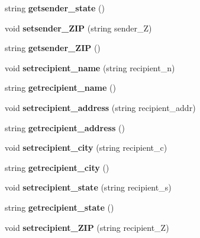 \begin{DoxyCompactItemize}
string {\bfseries getsender\+\_\+state} ()
\item 
\mbox{\label{class_package_a56cf09ba2ac0d10ccf1661d9394c6b85}} 
void {\bfseries setsender\+\_\+\+Z\+IP} (string sender\+\_\+Z)
\item 
\mbox{\label{class_package_a66539199f86eed481721ff0851676109}} 
string {\bfseries getsender\+\_\+\+Z\+IP} ()
\item 
\mbox{\label{class_package_a7f22cd63211c0c766ddf32926362c885}} 
void {\bfseries setrecipient\+\_\+name} (string recipient\+\_\+n)
\item 
\mbox{\label{class_package_a8022d4210f41bc9e0dae744aae7c5bbc}} 
string {\bfseries getrecipient\+\_\+name} ()
\item 
\mbox{\label{class_package_a5ec7ebc5d7640f5f8c8e1747689b5e8a}} 
void {\bfseries setrecipient\+\_\+address} (string recipient\+\_\+addr)
\item 
\mbox{\label{class_package_a68e6c329e3ee89e578befa648b3e47e8}} 
string {\bfseries getrecipient\+\_\+address} ()
\item 
\mbox{\label{class_package_a6a9facae5d8ccf6a6cd5128a8b3583e2}} 
void {\bfseries setrecipient\+\_\+city} (string recipient\+\_\+c)
\item 
\mbox{\label{class_package_aa9afd5572cd63edc9d5b754641e6ca4f}} 
string {\bfseries getrecipient\+\_\+city} ()
\item 
\mbox{\label{class_package_a94160244d96deaeb9361e544e98d0a9f}} 
void {\bfseries setrecipient\+\_\+state} (string recipient\+\_\+s)
\item 
\mbox{\label{class_package_a355178fb4b38c4b11620b96e67f9bc1c}} 
string {\bfseries getrecipient\+\_\+state} ()
\item 
\mbox{\label{class_package_a9ae0894bf750037e3923b1d9d410246c}} 
void {\bfseries setrecipient\+\_\+\+Z\+IP} (string recipient\+\_\+Z)
\item 

\end{DoxyCompactItemize}
